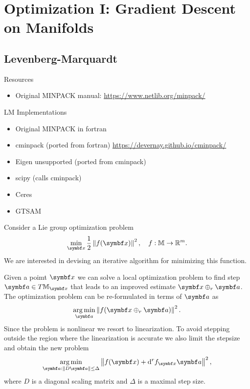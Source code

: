 
\chapter{Optimization I: Gradient Descent on Manifolds}

\section{Levenberg-Marquardt}

Resources
\begin{itemize}
  \item Original MINPACK manual: \url{https://www.netlib.org/minpack/}
\end{itemize}

LM Implementations
\begin{itemize}
  \item Original MINPACK in fortran
  \item cminpack (ported from fortran) \url{https://devernay.github.io/cminpack/}
  \item Eigen unsupported (ported from cminpack)
  \item scipy (calls cminpack)
  \item Ceres
  \item GTSAM
\end{itemize}


Consider a Lie group optimization problem
\begin{equation}
  \min_\x \frac{1}{2} \left\| f(\x) \right\|^2, \quad f : \M \rightarrow \mathbb{R}^m.
\end{equation}
We are interested in devising an iterative algorithm for minimizing this function.

Given a poimt $\x$ we can solve a local optimization problem to find step $\a \in T \M _\x$ that leads to an improved estimate $\x \oplus_r \a$. The optimization problem can be re-formulated in terms of $\a$ as
\begin{equation}
  \argmin_{\a} \left\| f(\x \oplus_r \a) \right\|^2.
\end{equation}
Since the problem is nonlinear we resort to linearization. To avoid stepping outside the region where the linearization is accurate we also limit the stepsize and obtain the new problem
\begin{equation}
  \label{eq:lm_minimize_trust}
  \argmin_{\a : \| D \a \| \leq \Delta}\left\| f(\x) + \mathrm{d}^r f_\x \a \right \|^2,
\end{equation}
where $D$ is a diagonal scaling matrix and $\Delta$ is a maximal step size.


